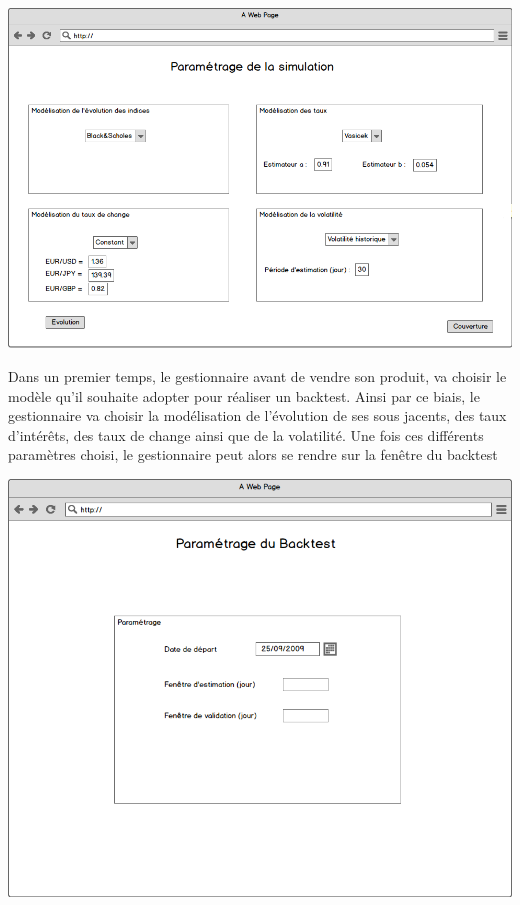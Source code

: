 \documentclass[french,12pt,a4paper]{article}
\begin{document}
\begin{center}
\includegraphics[scale=0.4]{../Maquette_3.png}
\end{center}

Dans un premier temps, le gestionnaire avant de vendre son produit, va choisir le modèle qu'il souhaite adopter pour réaliser un backtest. Ainsi par ce biais, le gestionnaire va choisir la modélisation de l'évolution de ses sous jacents, des taux d'intérêts, des taux de change ainsi que de la volatilité. Une fois ces différents paramètres choisi, le gestionnaire peut alors se rendre sur la fenêtre du backtest


\begin{center}
\includegraphics[scale=0.4]{../Maquette_7.png}
\end{center} 
 
\end{document}
